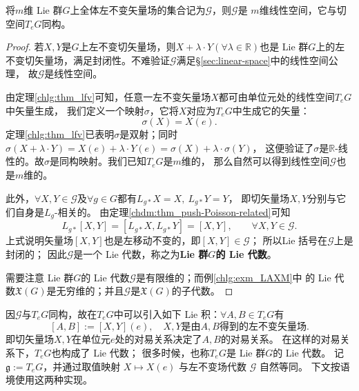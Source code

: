 \begin{theorem}\label{chlg:thm_lfvls}
    将$m$维 Lie 群$G$上全体左不变矢量场的集合记为$\mathscr{G}$，则$\mathscr{G}$是
    $m$维线性空间，它与切空间$T_eG$同构。
\end{theorem}
\begin{proof}
    若$X,Y$是$G$上左不变切矢量场，则$X+\lambda\cdot Y(\forall \lambda \in \mathbb{R})$也是
     Lie 群$G$上的左不变切矢量场，满足封闭性。不难验证$\mathscr{G}$满足\S\ref{sec:linear-space}中的线性空间公理，
    故$\mathscr{G}$是线性空间。

    由定理\ref{chlg:thm_lfv}可知，任意一左不变矢量场$X$都可由单位元处的线性空间$T_eG$中矢量生成，
    我们定义一个映射$\sigma$，它将$X$对应为$T_eG$中生成它的矢量：
    \begin{equation}
        \sigma (X) = X(e).
    \end{equation}
    定理\ref{chlg:thm_lfv}已表明$\sigma$是双射；同时$\sigma (X+\lambda \cdot Y)
    = X(e)+\lambda\cdot Y(e)=\sigma(X)+\lambda\cdot\sigma(Y)$，
    这便验证了$\sigma$是$\mathbb{R}$-线性的。故$\sigma$是同构映射。我们已知$T_eG$是$m$维的，
    那么自然可以得到线性空间$\mathscr{G}$也是$m$维的。

    此外，$\forall X,Y\in \mathscr{G}$及$\forall g\in G$都有$L_{g*}X=X,\ L_{g*}Y=Y$，
    即切矢量场$X,Y$分别与它们自身是$L_g$-相关的。
    由定理\ref{chdm:thm_push-Poisson-related}可知
    \begin{equation}\label{chlg:eqn_LgXY}
        L_{g*}[X,Y]=[L_{g*}X, L_{g*}Y]=[X,Y], \qquad \forall X,Y \in \mathscr{G}.
    \end{equation}
    上式说明矢量场$[X,Y]$也是左移动不变的，即$[X,Y]\in \mathscr{G}$；
    所以Lie 括号在$\mathscr{G}$上是封闭的；
    因此$\mathscr{G}$是一个 Lie 代数，称之为\textbf{Lie 群$G$的 Lie 代数}。

    需要注意 Lie 群$G$的 Lie 代数$\mathscr{G}$是有限维的；而例\ref{chlg:exm_LAXM}中
    的 Lie 代数$\mathfrak{X}(G)$是无穷维的；并且$\mathscr{G}$是$\mathfrak{X}(G)$的子代数。
\end{proof}

因$\mathscr{G}$与$T_eG$同构，故在$T_eG$中可以引入如下 Lie 积：$\forall A, B \in T_eG$有
\begin{equation}\label{chlg:eqn_LA-TeG}
    [A, B] := [X,Y](e), \quad
    X,Y \text{是由}A,B \text{得到的左不变矢量场}.
\end{equation}
即切矢量场$X,Y$在单位元$e$处的对易关系决定了$A, B$的对易关系。
在这样的对易关系下，$T_eG$也构成了 Lie 代数；
很多时候，也称$T_eG$是 Lie 群$G$的 Lie 代数。
记 $\mathfrak g:=T_eG$，并通过取值映射 $X\mapsto X(e)$ 与左不变场代数 $\mathscr G$ 自然等同。
下文按语境使用这两种实现。

